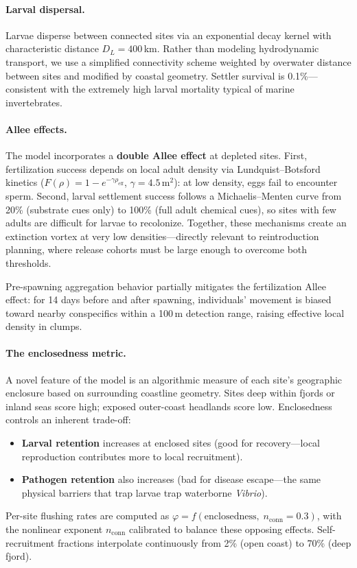 \paragraph{Larval dispersal.}
Larvae disperse between connected sites via an exponential decay kernel
with characteristic distance $D_L = 400$\,km.  Rather than modeling
hydrodynamic transport, we use a simplified connectivity scheme weighted by
overwater distance between sites and modified by coastal geometry.  Settler
survival is 0.1\%---consistent with the extremely high larval mortality
typical of marine invertebrates.

\paragraph{Allee effects.}
The model incorporates a \textbf{double Allee effect} at depleted sites.
First, fertilization success depends on local adult density via
Lundquist--Botsford kinetics ($F(\rho) = 1 - e^{-\gamma \rho_\mathrm{eff}}$,
$\gamma = 4.5$\,m$^2$): at low density, eggs fail to encounter sperm.
Second, larval settlement success follows a Michaelis--Menten curve from
20\% (substrate cues only) to 100\% (full adult chemical cues), so sites
with few adults are difficult for larvae to recolonize.  Together, these
mechanisms create an extinction vortex at very low densities---directly
relevant to reintroduction planning, where release cohorts must be large
enough to overcome both thresholds.

Pre-spawning aggregation behavior partially mitigates the fertilization
Allee effect: for 14 days before and after spawning, individuals' movement
is biased toward nearby conspecifics within a 100\,m detection range,
raising effective local density in clumps.

\paragraph{The enclosedness metric.}
A novel feature of the model is an algorithmic measure of each site's
geographic enclosure based on surrounding coastline geometry.  Sites deep
within fjords or inland seas score high; exposed outer-coast headlands score
low.  Enclosedness controls an inherent trade-off:
\begin{itemize}
  \item \textbf{Larval retention} increases at enclosed sites (good for
    recovery---local reproduction contributes more to local recruitment).
  \item \textbf{Pathogen retention} also increases (bad for disease
    escape---the same physical barriers that trap larvae trap waterborne
    \textit{Vibrio}).
\end{itemize}
Per-site flushing rates are computed as $\varphi = f(\text{enclosedness},\;
n_\mathrm{conn} = 0.3)$, with the nonlinear exponent $n_\mathrm{conn}$
calibrated to balance these opposing effects.  Self-recruitment fractions
interpolate continuously from 2\% (open coast) to 70\% (deep fjord).

